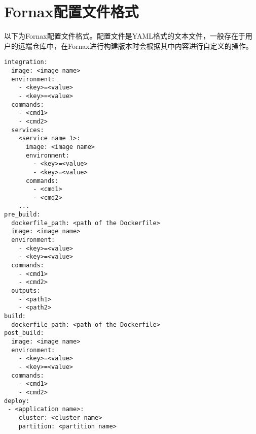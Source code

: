 \chapter{Fornax配置文件格式}

以下为Fornax配置文件格式。配置文件是YAML格式的文本文件，一般存在于用户的远端仓库中，在Fornax进行构建版本时会根据其中内容进行自定义的操作。

\begin{lstlisting}[caption={配置文件格式}]
integration:
  image: <image name>
  environment:
    - <key>=<value>
    - <key>=<value>
  commands:
    - <cmd1>
    - <cmd2>
  services:
    <service name 1>:
      image: <image name>
      environment:
        - <key>=<value>
        - <key>=<value>
      commands:
        - <cmd1>
        - <cmd2>
    ...
pre_build:
  dockerfile_path: <path of the Dockerfile>
  image: <image name>
  environment:
    - <key>=<value>
    - <key>=<value>
  commands:
    - <cmd1>
    - <cmd2>
  outputs:
    - <path1>
    - <path2>
build:
  dockerfile_path: <path of the Dockerfile>
post_build:
  image: <image name>
  environment:
    - <key>=<value>
    - <key>=<value>
  commands:
    - <cmd1>
    - <cmd2>
deploy:
 - <application name>:
    cluster: <cluster name>
    partition: <partition name>
\end{lstlisting}